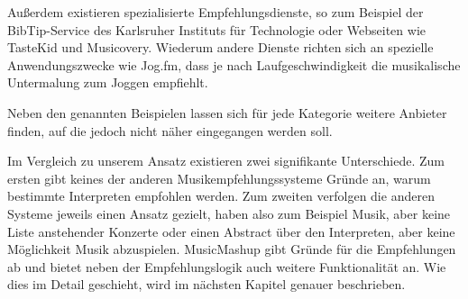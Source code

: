 Außerdem existieren spezialisierte Empfehlungsdienste, so zum Beispiel der BibTip-Service des Karlsruher Instituts für Technologie oder Webseiten wie TasteKid und Musicovery. Wiederum andere Dienste richten sich an spezielle Anwendungszwecke wie Jog.fm, dass je nach Laufgeschwindigkeit die musikalische Untermalung zum Joggen empfiehlt.

Neben den genannten Beispielen lassen sich für jede Kategorie weitere Anbieter finden, auf die jedoch nicht näher eingegangen werden soll.

Im Vergleich zu unserem Ansatz existieren zwei signifikante Unterschiede. Zum ersten gibt keines der anderen Musikempfehlungssysteme Gründe an, warum bestimmte Interpreten empfohlen werden. Zum zweiten verfolgen die anderen Systeme jeweils einen Ansatz gezielt, haben also zum Beispiel Musik, aber keine Liste anstehender Konzerte oder einen Abstract über den Interpreten, aber keine Möglichkeit Musik abzuspielen. MusicMashup gibt Gründe für die Empfehlungen ab und bietet neben der Empfehlungslogik auch weitere Funktionalität an. Wie dies im Detail geschieht, wird im nächsten Kapitel genauer beschrieben.